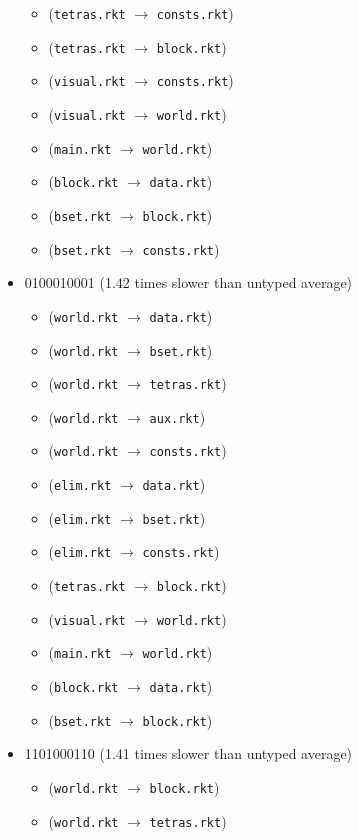 \documentclass{article}
\newcommand{\mono}[1]{\texttt{#1}}
\begin{document}
\begin{itemize}
\begin{itemize}
  \item (\mono{tetras.rkt} $\rightarrow$ \mono{consts.rkt})
  \item (\mono{tetras.rkt} $\rightarrow$ \mono{block.rkt})
  \item (\mono{visual.rkt} $\rightarrow$ \mono{consts.rkt})
  \item (\mono{visual.rkt} $\rightarrow$ \mono{world.rkt})
  \item (\mono{main.rkt} $\rightarrow$ \mono{world.rkt})
  \item (\mono{block.rkt} $\rightarrow$ \mono{data.rkt})
  \item (\mono{bset.rkt} $\rightarrow$ \mono{block.rkt})
  \item (\mono{bset.rkt} $\rightarrow$ \mono{consts.rkt})
  \end{itemize}
\item 0100010001 (1.42 times slower than untyped average)
  \begin{itemize}
  \item (\mono{world.rkt} $\rightarrow$ \mono{data.rkt})
  \item (\mono{world.rkt} $\rightarrow$ \mono{bset.rkt})
  \item (\mono{world.rkt} $\rightarrow$ \mono{tetras.rkt})
  \item (\mono{world.rkt} $\rightarrow$ \mono{aux.rkt})
  \item (\mono{world.rkt} $\rightarrow$ \mono{consts.rkt})
  \item (\mono{elim.rkt} $\rightarrow$ \mono{data.rkt})
  \item (\mono{elim.rkt} $\rightarrow$ \mono{bset.rkt})
  \item (\mono{elim.rkt} $\rightarrow$ \mono{consts.rkt})
  \item (\mono{tetras.rkt} $\rightarrow$ \mono{block.rkt})
  \item (\mono{visual.rkt} $\rightarrow$ \mono{world.rkt})
  \item (\mono{main.rkt} $\rightarrow$ \mono{world.rkt})
  \item (\mono{block.rkt} $\rightarrow$ \mono{data.rkt})
  \item (\mono{bset.rkt} $\rightarrow$ \mono{block.rkt})
  \end{itemize}
\item 1101000110 (1.41 times slower than untyped average)
  \begin{itemize}
  \item (\mono{world.rkt} $\rightarrow$ \mono{block.rkt})
  \item (\mono{world.rkt} $\rightarrow$ \mono{tetras.rkt})

\end{itemize}
\end{itemize}
\end{document}
